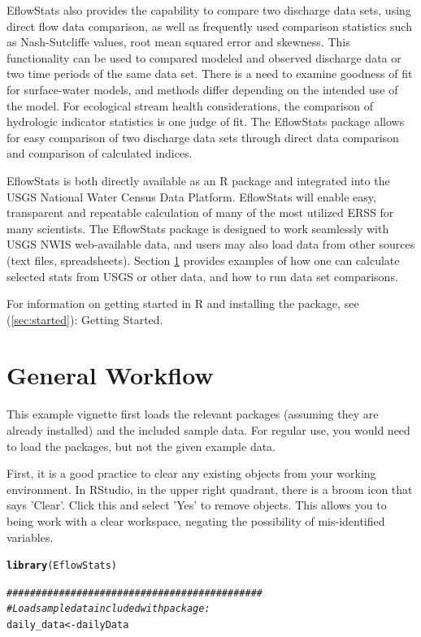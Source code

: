 \documentclass[a4paper,11pt]{article}\usepackage[]{graphicx}\usepackage[]{color}
\makeatletter
\newcommand{\hlcom}[1]{\textcolor[rgb]{0.678,0.584,0.686}{\textit{#1}}}%
\newcommand{\hlstd}[1]{\textcolor[rgb]{0.345,0.345,0.345}{#1}}%
\newcommand{\hlkwb}[1]{\textcolor[rgb]{0.69,0.353,0.396}{#1}}%
\newcommand{\hlkwd}[1]{\textcolor[rgb]{0.737,0.353,0.396}{\textbf{#1}}}%
\newenvironment{kframe}{%
 \def\at@end@of@kframe{}%
 \ifinner\ifhmode%
  \def\at@end@of@kframe{\end{minipage}}%
  \begin{minipage}{\columnwidth}%
 \fi\fi%
 \def\FrameCommand##1{\hskip\@totalleftmargin \hskip-\fboxsep
 \colorbox{shadecolor}{##1}\hskip-\fboxsep
     \hskip-\linewidth \hskip-\@totalleftmargin \hskip\columnwidth}%
 \MakeFramed {\advance\hsize-\width
   \@totalleftmargin\z@ \linewidth\hsize
   \@setminipage}}%
 {\par\unskip\endMakeFramed%
 \at@end@of@kframe}
\newenvironment{knitrout}{}{} %
\makeatother
\begin{document}
EflowStats also provides the capability to compare two discharge data sets, using direct flow data comparison, as well as frequently used comparison statistics such as Nash-Sutcliffe values, root mean squared error and skewness. This functionality can be used to compared modeled and observed discharge data or two time periods of the same data set. There is a need to examine goodness of fit for surface-water models, and methods differ depending on the intended use of the model. For ecological stream health considerations, the comparison of hydrologic indicator statistics is one judge of fit. The EflowStats package allows for easy comparison of two discharge data sets through direct data comparison and comparison of calculated indices.

EflowStats is both directly available as an R package and integrated into the USGS National Water Census Data Platform. EflowStats will enable easy, transparent and repeatable calculation of many of the most utilized ERSS for many scientists. The EflowStats package is designed to work seamlessly with USGS NWIS web-available data, and users may also load data from other sources (text files, spreadsheets).  Section \ref{sec:exampleWorkflow} provides examples of how one can calculate selected stats from USGS or other data, and how to run data set comparisons. 
              
For information on getting started in R and installing the package, see (\ref{sec:started}): Getting Started.

\section{General Workflow}
\label{sec:exampleWorkflow}

This example vignette first loads the relevant packages (assuming they are already installed) and the included sample data. For regular use, you would need to load the packages, but not the given example data.

First, it is a good practice to clear any existing objects from your working environment. In RStudio, in the upper right quadrant, there is a broom icon that says 'Clear'. Click this and select 'Yes' to remove objects. This allows you to being work with a clear workspace, negating the possibility of mis-identified variables. 

\begin{knitrout}
\color{fgcolor}\begin{kframe}
\begin{alltt}
\hlkwd{library}\hlstd{(EflowStats)}

\hlcom{############################################}
\hlcom{# Load sample data included with package:}
\hlstd{daily_data}\hlkwb{<-}\hlstd{dailyData}
\end{alltt}
\end{kframe}
\end{knitrout}
\end{document}
